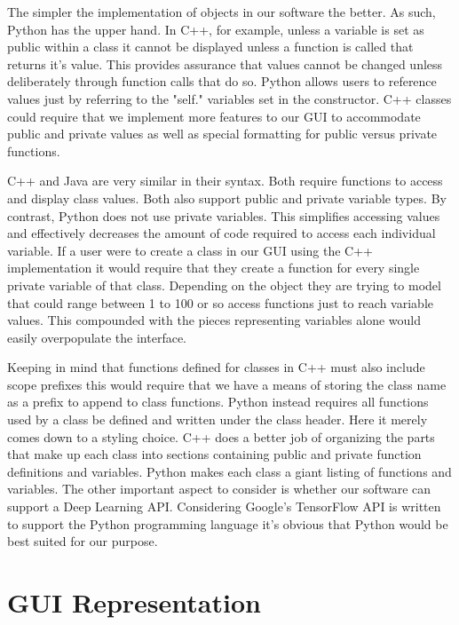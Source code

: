 \documentclass[journal,10pt,onecolumn,compsoc]{IEEEtran} \usepackage[margin=1.0in]{geometry} \usepackage{pdfpages} \usepackage{graphicx}
\begin{document}
\noindent The simpler the implementation of objects in our software the better. 
As such, Python has the upper hand. 
In C++, for example, unless a variable is set as public within a class it cannot be displayed unless a function is called that returns it's value. \cite{cclass} 
This provides assurance that values cannot be changed unless deliberately through function calls that do so.
Python allows users to reference values just by referring to the "self." variables set in the constructor. \cite{pythonclass} 
C++ classes could require that we implement more features to our GUI to accommodate public and private values as well as special formatting for public versus private functions.

\noindent C++ and Java are very similar in their syntax. 
Both require functions to access and display class values. 
Both also support public and private variable types. \cite{cclass} \cite{javaclass} 
By contrast, Python does not use private variables. 
This simplifies accessing values and effectively decreases the amount of code required to access each individual variable. 
If a user were to create a class in our GUI using the C++ implementation it would require that they create a function for every single private variable of that class. 
Depending on the object they are trying to model that could range between 1 to 100 or so access functions just to reach variable values.
This compounded with the pieces representing variables alone would easily overpopulate the interface.

\noindent Keeping in mind that functions defined for classes in C++ must also include scope prefixes this would require that we have a means of storing the class name as a prefix to append to class functions. 
Python instead requires all functions used by a class be defined and written under the class header. \cite{pythonclass} 
Here it merely comes down to a styling choice. 
C++ does a better job of organizing the parts that make up each class into sections containing public and private function definitions and variables.
Python makes each class a giant listing of functions and variables.
The other important aspect to consider is whether our software can support a Deep Learning API. 
Considering Google's TensorFlow API is written to support the Python programming language it's obvious that Python would be best suited for our purpose.

\newpage
\section{GUI Representation}
\end{document}
